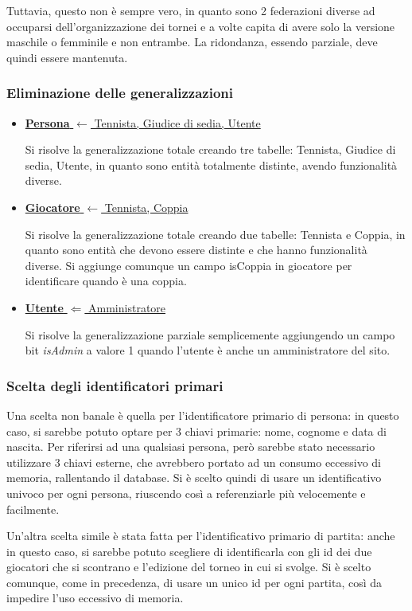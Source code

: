 \documentclass[10pt]{article}
\newcommand{\spazia}{\par\medskip}
\begin{document}
Tuttavia, questo non è sempre vero, in quanto sono 2 federazioni diverse ad occuparsi dell'organizzazione dei tornei e a volte capita di avere solo la versione maschile o femminile e non entrambe. La ridondanza, essendo parziale, deve quindi essere mantenuta. 

\subsubsection{Eliminazione delle generalizzazioni}
\begin{itemize}
    \item \underline{\textbf{Persona} $\longleftarrow$ Tennista, Giudice di sedia, Utente} \spazia
    Si risolve la generalizzazione totale creando tre tabelle: Tennista, Giudice di sedia, Utente, in quanto sono entità totalmente distinte, avendo funzionalità diverse.
    
    \item \underline{\textbf{Giocatore} $\longleftarrow$ Tennista, Coppia} \spazia
    Si risolve la generalizzazione totale creando due tabelle: Tennista e Coppia, in quanto sono entità che devono essere distinte e che hanno funzionalità diverse. Si aggiunge comunque un campo isCoppia in giocatore per identificare quando è una coppia.
    
    \item \underline{\textbf{Utente} $\Longleftarrow$ Amministratore} \spazia
    Si risolve la generalizzazione parziale semplicemente aggiungendo un campo bit \textit{isAdmin} a valore 1 quando l'utente è anche un amministratore del sito.
\end{itemize}

\subsubsection{Scelta degli identificatori primari}

Una scelta non banale è quella per l'identificatore primario di persona: in questo caso, si sarebbe potuto optare per 3 chiavi primarie: nome, cognome e data di nascita. Per riferirsi ad una qualsiasi persona, però sarebbe stato necessario utilizzare 3 chiavi esterne, che avrebbero portato ad un consumo eccessivo di memoria, rallentando il database. Si è scelto quindi di usare un identificativo univoco per ogni persona, riuscendo così a referenziarle più velocemente e facilmente.\spazia

Un'altra scelta simile è stata fatta per l'identificativo primario di partita: anche in questo caso, si sarebbe potuto scegliere di identificarla con gli id dei due giocatori che si scontrano e l'edizione del torneo in cui si svolge. Si è scelto comunque, come in precedenza, di usare un unico id per ogni partita, così da impedire l'uso eccessivo di memoria.\pagebreak
\end{document}
